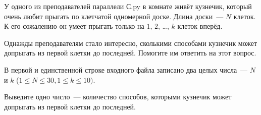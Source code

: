 

У одного из преподавателей параллели С.py в комнате живёт кузнечик, который очень любит прыгать по клетчатой одномерной доске. Длина доски~--- $N$ клеток. К его сожалению он умеет прыгать только на $1$, $2$, \dots, $k$ клеток вперёд. 

Однажды преподавателям стало интересно, сколькими способами кузнечик может допрыгать из первой клетки до последней. Помогите им ответить на этот вопрос.


\InputFile
В первой и единственной строке входного файла записано два целых числа~--- $N$ и $k$ ($1 \leqslant N \leqslant 30, 1 \leqslant k \leqslant 10)$.


\OutputFile
Выведите одно число~--- количество способов, которыми кузнечик может допрыгать из первой клетки до последней.

